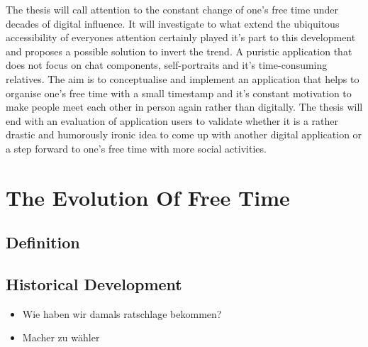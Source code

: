 \documentclass[12pt,numbers=noenddot,parskip,bibliography=totocnumbered,listof=totocnumbered]{scrreprt}
\begin{document}
The thesis will call attention to the constant change of one's free time under decades of digital influence. It will investigate to what extend the ubiquitous accessibility of everyones attention certainly played it's part to this development and proposes a possible solution to invert the trend. A puristic application that does not focus on chat components, self-portraits and it's time-consuming relatives. The aim is to conceptualise and implement an application that helps to organise one's free time with a small timestamp and it's constant motivation to make people meet each other in person again rather than digitally. The thesis will end with an evaluation of application users to validate whether it is a rather drastic and humorously ironic idea to come up with another digital application or a step forward to one's free time with more social activities.


\chapter{The Evolution Of Free Time}

\section{Definition}

\section{Historical Development}
\begin{itemize} 
	\item Wie haben wir damals ratschlage bekommen?
	\item Macher zu wähler
\end{itemize} 
\end{document}
